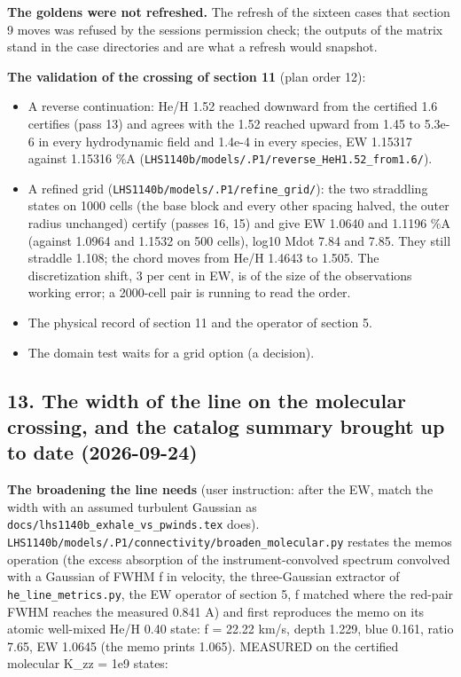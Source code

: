 \documentclass[english,a4paper]{my_memo}
\providecommand{\tightlist}{\setlength{\itemsep}{0pt}\setlength{\parskip}{0pt}}
\begin{document}
\textbf{The goldens were not refreshed.} The refresh of the sixteen cases that
section 9 moves was refused by the session\textquotesingle s permission check; the outputs of
the matrix stand in the case directories and are what a refresh would
snapshot.

\textbf{The validation of the crossing of section 11} (plan order 12):

\begin{itemize}
\tightlist
\item
  A reverse continuation: He/H 1.52 reached downward from the certified 1.6
  certifies (pass 13) and agrees with the 1.52 reached upward from 1.45 to
  5.3e-6 in every hydrodynamic field and 1.4e-4 in every species, EW 1.15317
  against 1.15316 \%A (\texttt{LHS1140b/models/.P1/reverse\_HeH1.52\_from1.6/}).
\item
  A refined grid (\texttt{LHS1140b/models/.P1/refine\_grid/}): the two straddling
  states on 1000 cells (the base block and every other spacing halved, the
  outer radius unchanged) certify (passes 16, 15) and give EW 1.0640 and
  1.1196 \%A (against 1.0964 and 1.1532 on 500 cells), log10 Mdot 7.84 and
  7.85. They still straddle 1.108; the chord moves from He/H 1.4643 to 1.505.
  The discretization shift, 3 per cent in EW, is of the size of the
  observation\textquotesingle s working error; a 2000-cell pair is running to read the order.
\item
  The physical record of section 11 and the operator of section 5.
\item
  The domain test waits for a grid option (a decision).
\end{itemize}

\subsection{13. The width of the line on the molecular crossing, and the catalog summary brought up to date (2026-09-24)}\label{13-the-width-of-the-line-on-the-molecular-crossing-and-the-catalog-summary-brought-up-to-date-2026-09-24}

\textbf{The broadening the line needs} (user instruction: after the EW, match the
width with an assumed turbulent Gaussian as \texttt{docs/lhs1140b\_exhale\_vs\_pwinds.tex}
does). \texttt{LHS1140b/models/.P1/connectivity/broaden\_molecular.py} restates the
memo\textquotesingle s operation (the excess absorption of the instrument-convolved spectrum
convolved with a Gaussian of FWHM f in velocity, the three-Gaussian extractor
of \texttt{he\_line\_metrics.py}, the EW operator of section 5, f matched where the
red-pair FWHM reaches the measured 0.841 A) and first reproduces the memo on
its atomic well-mixed He/H 0.40 state: f = 22.22 km/s, depth 1.229, blue
0.161, ratio 7.65, EW 1.0645 (the memo prints 1.065). MEASURED on the
certified molecular K\_zz = 1e9 states:
\end{document}
